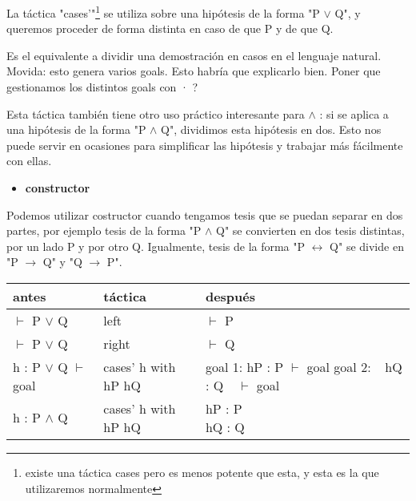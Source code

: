 \documentclass{article}
\begin{document}
La táctica "cases'"\footnote{existe una táctica cases pero es menos potente que esta, y esta es la que utilizaremos normalmente} se utiliza sobre una hipótesis de la forma "P $\lor$ Q", y queremos proceder de forma distinta en caso de que P y de que Q.

Es el equivalente a dividir una demostración en casos en el lenguaje natural. Movida: esto genera varios goals. Esto habría que explicarlo bien. Poner que gestionamos los distintos goals con · ?

Esta táctica también tiene otro uso práctico interesante para $\land$ : si se aplica a una hipótesis de la forma "P $\land$ Q", dividimos esta hipótesis en dos. Esto nos puede servir en ocasiones para simplificar las hipótesis y trabajar más fácilmente con ellas.

\begin{itemize}
    \item \textbf{constructor}
\end{itemize}

Podemos utilizar costructor cuando tengamos tesis que se puedan separar en dos partes, por ejemplo tesis de la forma "P $\land$ Q" se convierten en dos tesis distintas, por un lado P y por otro Q. Igualmente, tesis de la forma "P $\leftrightarrow$ Q" se divide en "P $\rightarrow$ Q" y "Q $\rightarrow$ P".


\begin{center}
\begin{tabular}{ | m{8em} | m{8em}| m{8em} | } 
  \hline
  \textbf{antes} & \textbf{táctica} & \textbf{después} \\
  \hline
  $\vdash$ P $\lor$ Q & left & $\vdash$ P \\
  \hline
  $\vdash$ P $\lor$ Q & right & $\vdash$ Q \\
  \hline
  \parbox{8em}{h : P $\lor$ Q \\ $\vdash$ goal} & cases' h with hP hQ & \parbox{8em}{goal 1: \\ hP : P \\ $\vdash$ goal \\[1ex] goal 2: \\ $~~$ hQ : Q \\ $~~$ $\vdash$ goal} \\
  \hline
  h : P $\land$ Q & cases' h with hP hQ & \parbox{8em}{hP : P \\ hQ : Q }\\
  \hline
  
\end{tabular}
\end{center}




\end{document}
